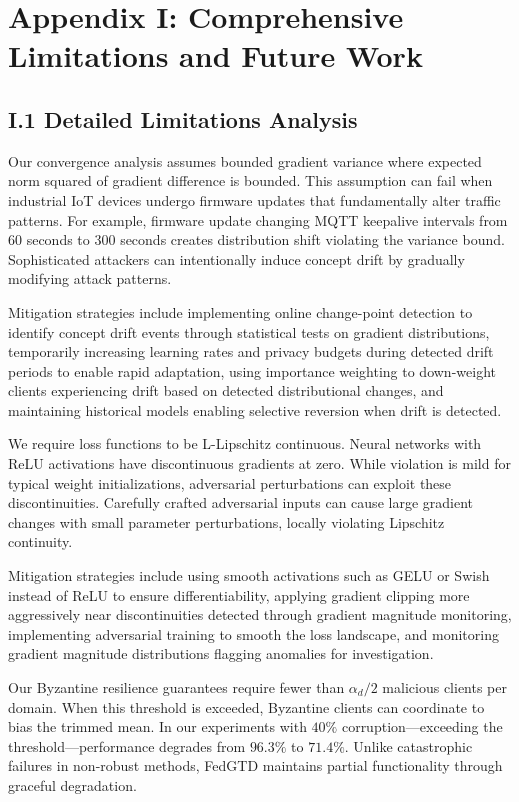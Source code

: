 \documentclass[12pt,a4paper]{article}
\theoremstyle{definition}
\begin{document}
\section{Appendix I: Comprehensive Limitations and Future Work}

\subsection{I.1 Detailed Limitations Analysis}

Our convergence analysis assumes bounded gradient variance where expected norm squared of gradient difference is bounded. This assumption can fail when industrial IoT devices undergo firmware updates that fundamentally alter traffic patterns. For example, firmware update changing MQTT keepalive intervals from 60 seconds to 300 seconds creates distribution shift violating the variance bound. Sophisticated attackers can intentionally induce concept drift by gradually modifying attack patterns.

Mitigation strategies include implementing online change-point detection to identify concept drift events through statistical tests on gradient distributions, temporarily increasing learning rates and privacy budgets during detected drift periods to enable rapid adaptation, using importance weighting to down-weight clients experiencing drift based on detected distributional changes, and maintaining historical models enabling selective reversion when drift is detected.

We require loss functions to be L-Lipschitz continuous. Neural networks with ReLU activations have discontinuous gradients at zero. While violation is mild for typical weight initializations, adversarial perturbations can exploit these discontinuities. Carefully crafted adversarial inputs can cause large gradient changes with small parameter perturbations, locally violating Lipschitz continuity.

Mitigation strategies include using smooth activations such as GELU or Swish instead of ReLU to ensure differentiability, applying gradient clipping more aggressively near discontinuities detected through gradient magnitude monitoring, implementing adversarial training to smooth the loss landscape, and monitoring gradient magnitude distributions flagging anomalies for investigation.

\begingroup
\setlength{\emergencystretch}{2em}

Our Byzantine resilience guarantees require fewer than \(\alpha_d/2\) malicious clients per domain. When this threshold is exceeded, Byzantine clients can coordinate to bias the trimmed mean. In our experiments with \(40\%\) corruption—exceeding the threshold—performance degrades from \(96.3\%\) to \(71.4\%\). Unlike catastrophic failures in non-robust methods, FedGTD maintains partial functionality through graceful degradation.
\end{document}
